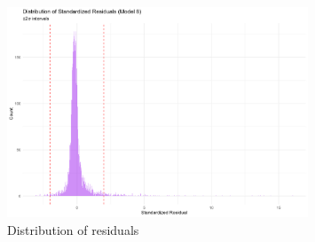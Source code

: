 \documentclass[a4paper,12pt]{article}
\begin{document}
 
\begin{figure}[H]
    \centering
    \caption{Distribution of residuals}
    \label{fig:Distribution of residuals}
    \includegraphics[width=0.8\textwidth,  height=0.5\textwidth]{Distribution_residuals.jpg}
\end{figure}
\end{document}
